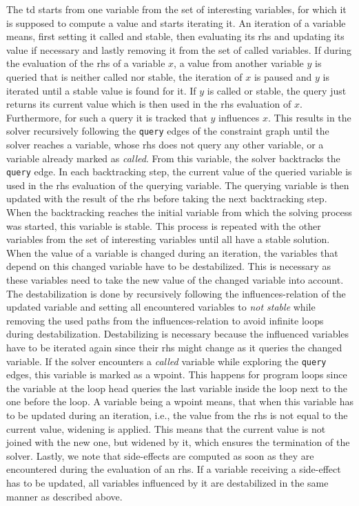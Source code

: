   The \ac{td} starts from one variable from the set of interesting variables, for which it is supposed to compute a value and starts iterating it. An iteration of a variable means, first setting it called and stable, then evaluating its \ac{rhs} and updating its value if necessary and lastly removing it from the set of called variables. If during the evaluation of the \ac{rhs} of a variable $x$, a value from another variable $y$ is queried that is neither called nor stable, the iteration of $x$ is paused and $y$ is iterated until a stable value is found for it. If $y$ is called or stable, the query just returns its current value which is then used in the \ac{rhs} evaluation of $x$. Furthermore, for such a query it is tracked that $y$ influences $x$. This results in the solver recursively following the \texttt{query} edges of the constraint graph until the solver reaches a variable, whose \ac{rhs} does not query any other variable, or a variable already marked as \textit{called}. From this variable, the solver backtracks the \texttt{query} edge. In each backtracking step, the current value of the queried variable is used in the \ac{rhs} evaluation of the querying variable. The querying variable is then updated with the result of the \ac{rhs} before taking the next backtracking step. When the backtracking reaches the initial variable from which the solving process was started, this variable is stable. This process is repeated with the other variables from the set of interesting variables until all have a stable solution.
  When the value of a variable is changed during an iteration, the variables that depend on this changed variable have to be destabilized. This is necessary as these variables need to take the new value of the changed variable into account. The destabilization is done by recursively following the influences-relation of the updated variable and setting all encountered variables to \textit{not stable} while removing the used paths from the influences-relation to avoid infinite loops during destabilization. Destabilizing is necessary because the influenced variables have to be iterated again since their \ac{rhs} might change as it queries the changed variable.
  If the solver encounters a \textit{called} variable while exploring the \texttt{query} edges, this variable is marked as a wpoint. This happens for program loops since the variable at the loop head queries the last variable inside the loop next to the one before the loop. A variable being a wpoint means, that when this variable has to be updated during an iteration, i.e., the value from the \ac{rhs} is not equal to the current value, widening is applied. This means that the current value is not joined with the new one, but widened by it, which ensures the termination of the solver. 
  Lastly, we note that side-effects are computed as soon as they are encountered during the evaluation of an \ac{rhs}. If a variable receiving a side-effect has to be updated, all variables influenced by it are destabilized in the same manner as described above.
